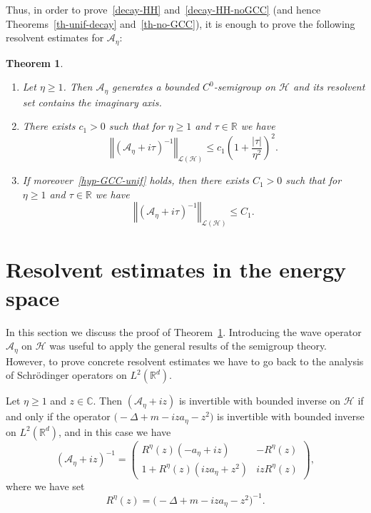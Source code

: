 \documentclass[10pt]{amsart}
\newtheorem{theo}{Theorem}[section]
\theoremstyle{definition}\newtheorem{defi}[theo]{Definition}\newtheorem{rema}[theo]{Remark}\newtheorem{exam}[theo]{Example}\newtheorem{exem}[theo]{Example}\newtheorem{nota}[theo]{Notation}
\newcommand{\abs}[1]{\left\vert #1\right\vert}
\newcommand{\nr}[1]{\left\Vert #1\right\Vert}
\renewcommand{\leq}{\leqslant}
\renewcommand{\geq}{\geqslant}
\newcommand{\inv}{^{-1}}
\newcommand{\1}{\mathds 1}
\newcommand{\R}{\mathbb{R}}
\newcommand{\D}{\Delta}
\renewcommand{\t}{\tau}
\newcommand{\Ac}{{\mathcal A}}
\newcommand{\Hc}{{\mathcal H}}
\newcommand{\Lc}{{\mathcal L}}
\newcommand{\HH}{\mathcal H}
\providecommand{\pointir}{.\ }
\begin{document}
Thus, in order to prove~\eqref{decay-HH} and~\eqref{decay-HH-noGCC} (and hence Theorems~\ref{th-unif-decay} and~\ref{th-no-GCC}), it is enough to prove the following resolvent estimates for $\Ac_\eta$:

\let\oldpointir\pointir
\renewcommand{\pointir}{}
\begin{theo}\label{th-res-Ac}\ 
\begin{enumerate}%
\item Let $\eta \geq 1$. Then $\Ac_\eta$ generates a bounded $C^0$-semigroup on $\HH$ and its resolvent set contains the imaginary axis.
\item There exists $c_1 > 0$ such that for $\eta \geq 1$ and $\t \in \R$ we have
\[
\nr{(\Ac_\eta + i\tau)\inv}_{\Lc(\HH)} \leq c_1 \left(1+\frac {\abs{\t}}{\eta^2} \right)^2.
\]
\item If moreover~\eqref{hyp-GCC-unif} holds, then there exists $C_1 > 0$ such that for $\eta \geq 1$ and $\t \in \R$ we have
\[
\nr{(\Ac_\eta + i\tau)\inv}_{\Lc(\HH)} \leq C_1.
\]
\end{enumerate}
\end{theo}
\let\pointir\oldpointir

\section{Resolvent estimates in the energy space} \label{sec-res-from-L2-to-Hc}

In this section we discuss the proof of Theorem~\ref{th-res-Ac}. Introducing the wave operator $\Ac_\eta$ on $\HH$ was useful to apply the general results of the semigroup theory. However, to prove concrete resolvent estimates we have to go back to the analysis of Schr\"odinger operators on $L^2(\R^d)$.

\begin{prop}\label{prop-res-Ac-Rz}
Let $\eta \geq 1$ and $z \in \mathbb C$. Then $(\Ac_\eta +iz)$ is invertible with bounded inverse on $\Hc$ if and only if the operator $ {\big(-\D + m -iza_\eta -z^2\big)} $ is invertible with bounded inverse on $L^2(\R^d)$, and in this case we have
\begin{equation}\label{expr-res-Ac}
(\Ac_\eta +iz)\inv =
\begin{pmatrix}
R^\eta(z) (-a_\eta + iz) & -R^\eta(z) \\
1 + R^\eta(z) (iz a_\eta+z^2) & i z R^\eta(z)
\end{pmatrix},
\end{equation}
where we have set
\[
R^\eta(z) = \big(-\D + m -iza_\eta -z^2\big)\inv.
\]
\end{prop}
\end{document}
